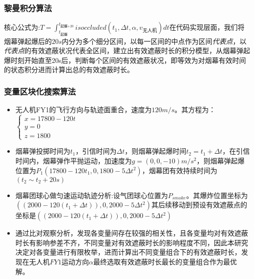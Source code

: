 \documentclass{article}
\begin{document}
\subsubsection{黎曼积分算法}
核心公式为:$T = \int_{t_\text{起爆}}^{t_\text{起爆+20}}isoccluded(t_1,\Delta t , \alpha , v_\text{无人机})dt$在代码实现层面，我们将烟幕弹起爆后的$20s$内分为多个细分区间，以每一区间的中点作为区间\textit{代表点}，以\textit{代表点}的有效遮蔽状况代表全区间，建立出有效遮蔽时长的积分模型，从烟幕弹起爆时刻开始直至20s后，判断每个区间的有效遮蔽状况，即等效为对烟幕有效时间的状态积分进而计算出总的有效遮蔽时长。
\subsubsection{变量区块化搜索算法}
\begin{itemize}
    \item 无人机FY1的飞行方向与轨迹面重合，速度为$120m/s$。其方程为：$\begin{cases}
        x = 17800 - 120t \\
        y = 0 \\
        z = 1800
    \end{cases}$
    \item 烟幕弹投掷时间为$t_1$，引信时间为$\Delta t$，则烟幕弹起爆时间$t_2 = t_1 + \Delta t$，在引信时间内，烟幕弹作平抛运动，加速度为$g = (0,0,-10)$$m/s^2$，则烟幕弹起爆位置为$P_1(17800 - 120t_1,0,1800 - 5\Delta t^2)$，烟幕团有效持续时间为$(t_2 \sim t_2 + 20s)$
    \item 烟幕团球心做匀速运动轨迹分析:设气团球心位置为$P_{smoke}$。其爆炸位置坐标为$((2000-120(t_1 + \Delta t)),0,2000-5 \Delta t^2)$其后续移动到预设有效遮蔽点的坐标是$((2000-120(t_1 + \Delta t)),0,2000-5 \Delta t^2)$
    \item 通过比对观察分析，发现各变量间存在较强的相关性，且各变量均对有效遮蔽时长有影响参差不齐，不同变量对有效遮蔽时长的影响程度不同，因此本研究决定对各变量进行有限枚举，进而计算出不同变量组合下的有效遮蔽时长，发现在$无人机FY1运动方向\alpha$最终选取有效遮蔽时长最长的变量组合作为最优解。
\end{itemize}
\end{document}

